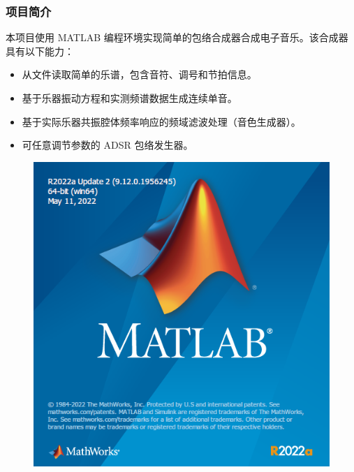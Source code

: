 \documentclass[utf8,10pt]{beamer}
\begin{document}
\begin{frame}
\end{frame}

\begin{frame}
    \frametitle{项目简介}

    本项目使用 MATLAB 编程环境实现简单的包络合成器合成电子音乐。该合成器具有以下能力：

    \begin{itemize}
        \item 从文件读取简单的乐谱，包含音符、调号和节拍信息。
        \item 基于乐器振动方程和实测频谱数据生成连续单音。
        \item 基于实际乐器共振腔体频率响应的频域滤波处理（音色生成器）。
        \item 可任意调节参数的 ADSR 包络发生器。
    \end{itemize}

    \begin{figure}[htpb]
        \centering
        \includegraphics[height=0.4\textheight]{figures/20221116102905.png}
        \label{fig:matlab}
    \end{figure}

\end{frame}
\end{document}
